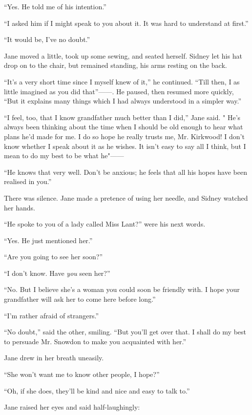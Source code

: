 ``Yes. He told me of his intention.''

``I asked him if I might speak to you about it. It was hard to
understand at first.''

``It would be, I've no doubt.''

Jane moved a little, took up some sewing, {}and seated herself. Sidney
let his hat drop on to the chair, but remained standing, his arms
resting on the back.

``It's a very short time since I myself knew of it,'' he continued.
``Till then, I as little imagined as you did {that''{{------}}.} He
paused, then resumed more quickly, ``But it explains many things which I
had always understood in a simpler way.''

``I feel, too, that I know grandfather much better than I did,'' Jane
said. " He's always been thinking about the time when I should be old
enough to hear what plans he'd made for me. I do so hope he really
trusts me, Mr. Kirkwood! I don't know whether I speak about it as he
wishes. It isn't easy to say all I think, but I mean to do my best to be
what {he"{{------}}}

``He knows that very well. Don't be anxious; he feels that all his hopes
have been realised in you.''

There was silence. Jane made a pretence of using her needle, and Sidney
watched her hands.

{}``He spoke to you of a lady called Miss Lant?'' were his next words.

``Yes. He just mentioned her.''

``Are you going to see her soon?''

``I don't know. Have \emph{you} seen her?''

``No. But I believe she's a woman you could soon be friendly with. I
hope your grandfather will ask her to come here before long.''

``I'm rather afraid of strangers.''

``No doubt,'' said the other, smiling. ``But you'll get over that. I
shall do my best to persuade Mr. Snowdon to make you acquainted with
her.''

Jane drew in her breath uneasily.

``She won't want me to know other people, I hope?''

``Oh, if she does, they'll be kind and nice and easy to talk to.''

Jane raised her eyes and said half-laughingly:

